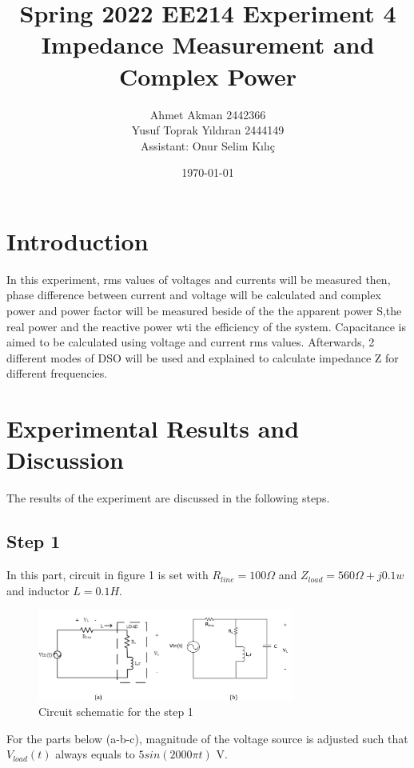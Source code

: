 \documentclass[letterpaper,12pt]{article}
\begin{document}
\thispagestyle{empty}

\title{Spring 2022 EE214 Experiment 4  \protect\\ Impedance Measurement and Complex Power}
\author{Ahmet Akman 2442366 \protect\\ Yusuf Toprak Yıldıran 2444149 \protect\\ Assistant: Onur Selim Kılıç}
\date{\today}
\maketitle
\tableofcontents
\section{Introduction}
In this experiment, rms values of voltages and currents will be measured then, phase difference between current and voltage will be calculated and complex power and power factor will be measured beside of the the apparent power S,the real power and the reactive power wti the efficiency of the system. Capacitance is aimed to be calculated using voltage and current rms values. Afterwards, 2 different modes of DSO will be used and explained to calculate impedance Z for different frequencies.

\section{Experimental Results and Discussion}
The results of the experiment are discussed in the following steps.
%
\subsection{Step 1}

In this part, circuit in figure 1 is set with \(R_{line}= 100\Omega\) and \(Z_{load}= 560\Omega + j0.1w\) and inductor \(L= 0.1H\).
\begin{figure}[H]
    \centering
    \includegraphics[width = 0.75\textwidth]{1SCH.png}
    \caption{Circuit schematic for the step 1}
\end{figure} 
For the parts below (a-b-c), magnitude of the voltage source is adjusted such that \(V_{load}(t)\) always equals to \(5sin(2000\pi t)\) V. 
\end{document}
